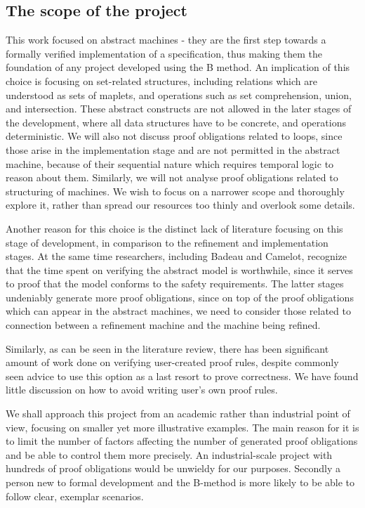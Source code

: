 \documentclass[12pt,journal,duplex]{IEEEtran}
\begin{document}
	\subsection{The scope of the project}
	This work focused on abstract machines - they are the first step towards a formally verified implementation of a specification, thus making them the foundation of any project developed using the B method. An implication of this choice is focusing on set-related structures, including relations which are understood as sets of maplets, and operations such as set comprehension, union, and intersection. These abstract constructs are not allowed in the later stages of the development, where all data structures have to be concrete, and operations deterministic. We will also not discuss proof obligations related to loops, since those arise in the implementation stage and are not permitted in the abstract machine, because of their sequential nature which requires temporal logic to reason about them. Similarly, we will not analyse proof obligations related to structuring of machines. We wish to focus on a narrower scope and thoroughly explore it, rather than spread our resources too thinly and overlook some details.

	Another reason for this choice is the distinct lack of literature focusing on this stage of development, in comparison to the refinement and implementation stages. At the same time researchers, including Badeau and Camelot, recognize that the time spent on verifying the abstract model is worthwhile, since it serves to proof that the model conforms to the safety requirements\cite{airport shuttle}. The latter stages undeniably generate more proof obligations, since on top of the proof obligations which can appear in the abstract machines, we need to consider those related to connection between a refinement machine and the machine being refined.

	Similarly, as can be seen in the literature review, there has been significant amount of work done on verifying user-created proof rules, despite commonly seen advice to use this option as a last resort to prove correctness. We have found little discussion on how to avoid writing user's own proof rules.

	We shall approach this project from an academic rather than industrial point of view, focusing on smaller yet more illustrative examples. The main reason for it is to limit the number of factors affecting the number of generated proof obligations and be able to control them more precisely. An industrial-scale project with hundreds of proof obligations would be unwieldy for our purposes. Secondly a person new to formal development and the B-method is more likely to be able to follow clear, exemplar scenarios.
\end{document}

